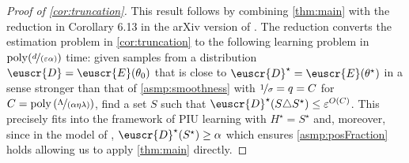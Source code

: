 \documentclass[11pt]{article}
\theoremstyle{plain}
\theoremstyle{definition}
\theoremstyle{remark}
\newcommand{\inparen}[1]{\left(#1\right)}
\newcommand{\nfrac}[2]{\nicefrac{#1}{#2}}
\newcommand{\poly}{\mathrm{poly}}
\newcommand{\eps}{\varepsilon}
\newcommand{\customcal}[1]{\euscr{#1}}
\newcommand{\cD}{\customcal{D}}
\newcommand{\cE}{\customcal{E}}
\newcommand{\optset}{{H^\star}}
\newcommand{\cDtrue}{\cD^\star}
\begin{document}
    \begin{proof}[Proof of \cref{cor:truncation}]
        This result follows by combining \cref{thm:main} with the reduction in Corollary 6.13 in the arXiv version of \cite{lee2024unknown}.
        The reduction converts the estimation problem in \cref{cor:truncation} to the following learning problem in $\poly(\nfrac{d}{(\eps\alpha)})$ time:
            given samples from a distribution $\cD=\cE(\theta_0)$ that is close to $\cDtrue=\cE(\theta^\star)$ in a sense stronger than that of \cref{asmp:smoothness} with $\nfrac{1}{\sigma}=q=C$ for $C=\poly\inparen{\nfrac{\Lambda}{(\alpha\eta\lambda)}}$, find a set $S$ such that $\cDtrue(S\triangle S^\star)\leq \eps^{O(C)}$.
        This precisely fits into the framework of PIU learning with $\optset=S^\star$ and, moreover, since in the model of \citet{lee2024unknown}, $\cDtrue(S^\star)\geq \alpha$ which ensures \cref{asmp:posFraction} holds allowing us to apply \cref{thm:main} directly.
    \end{proof}
\end{document}
